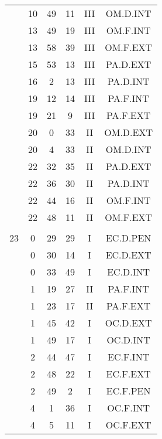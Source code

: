 \documentclass[12pt, a4paper]{article}
\begin{document}
\begin{multicols}{3}
{\begin{tabular}{c c c c c c}
	 	 	 	 & 10 & 49 & 11 & III & OM.D.INT\\%
	 	 	 	 & 13 & 49 & 19 & III & OM.F.INT\\%
	 	 	 	 & 13 & 58 & 39 & III & OM.F.EXT\\%
	 	 	 	 & 15 & 53 & 13 & III & PA.D.EXT\\%
	 	 	 	 & 16 & 2 & 13 & III & PA.D.INT\\%
	 	 	 	 & 19 & 12 & 14 & III & PA.F.INT\\%
	 	 	 	 & 19 & 21 & 9 & III & PA.F.EXT\\%
	 	 	 	 & 20 & 0 & 33 & II & OM.D.EXT\\%
	 	 	 	 & 20 & 4 & 33 & II & OM.D.INT\\%
	 	 	 	 & 22 & 32 & 35 & II & PA.D.EXT\\%
	 	 	 	 & 22 & 36 & 30 & II & PA.D.INT\\%
	 	 	 	 & 22 & 44 & 16 & II & OM.F.INT\\%
	 	 	 	 & 22 & 48 & 11 & II & OM.F.EXT\\%
	 	 	 	 & & & & & \\%
	 	 	 	23 & 0 & 29 & 29 & I & EC.D.PEN\\%
	 	 	 	 & 0 & 30 & 14 & I & EC.D.EXT\\%
	 	 	 	 & 0 & 33 & 49 & I & EC.D.INT\\%
	 	 	 	 & 1 & 19 & 27 & II & PA.F.INT\\%
	 	 	 	 & 1 & 23 & 17 & II & PA.F.EXT\\%
	 	 	 	 & 1 & 45 & 42 & I & OC.D.EXT\\%
	 	 	 	 & 1 & 49 & 17 & I & OC.D.INT\\%
	 	 	 	 & 2 & 44 & 47 & I & EC.F.INT\\%
	 	 	 	 & 2 & 48 & 22 & I & EC.F.EXT\\%
	 	 	 	 & 2 & 49 & 2 & I & EC.F.PEN\\%
	 	 	 	 & 4 & 1 & 36 & I & OC.F.INT\\%
	 	 	 	 & 4 & 5 & 11 & I & OC.F.EXT\\%
	 	 \end{tabular}
 	}
\end{multicols}
\end{document}
